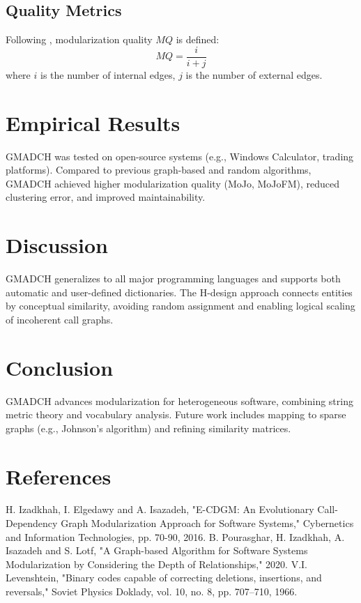 \documentclass[a4paper,12pt]{article}
\begin{document}
\subsection{Quality Metrics}
Following \cite{Izadkhah2016}, modularization quality $MQ$ is defined:
\[
MQ = \frac{i}{i + j}
\]
where $i$ is the number of internal edges, $j$ is the number of external edges.

\section{Empirical Results}
GMADCH was tested on open-source systems (e.g., Windows Calculator, trading platforms). Compared to previous graph-based and random algorithms, GMADCH achieved higher modularization quality (MoJo, MoJoFM), reduced clustering error, and improved maintainability.

\section{Discussion}
GMADCH generalizes to all major programming languages and supports both automatic and user-defined dictionaries. The H-design approach connects entities by conceptual similarity, avoiding random assignment and enabling logical scaling of incoherent call graphs.

\section{Conclusion}
GMADCH advances modularization for heterogeneous software, combining string metric theory and vocabulary analysis. Future work includes mapping to sparse graphs (e.g., Johnson's algorithm) and refining similarity matrices.

\section{References}

\begin{thebibliography}{99}
 H. Izadkhah, I. Elgedawy and A. Isazadeh, "E-CDGM: An Evolutionary Call-Dependency Graph Modularization Approach for Software Systems," Cybernetics and Information Technologies, pp. 70-90, 2016.
 B. Pourasghar, H. Izadkhah, A. Isazadeh and S. Lotf, "A Graph-based Algorithm for Software Systems Modularization by Considering the Depth of Relationships," 2020.
 V.I. Levenshtein, "Binary codes capable of correcting deletions, insertions, and reversals," Soviet Physics Doklady, vol. 10, no. 8, pp. 707–710, 1966.
\end{thebibliography}
\end{document}

